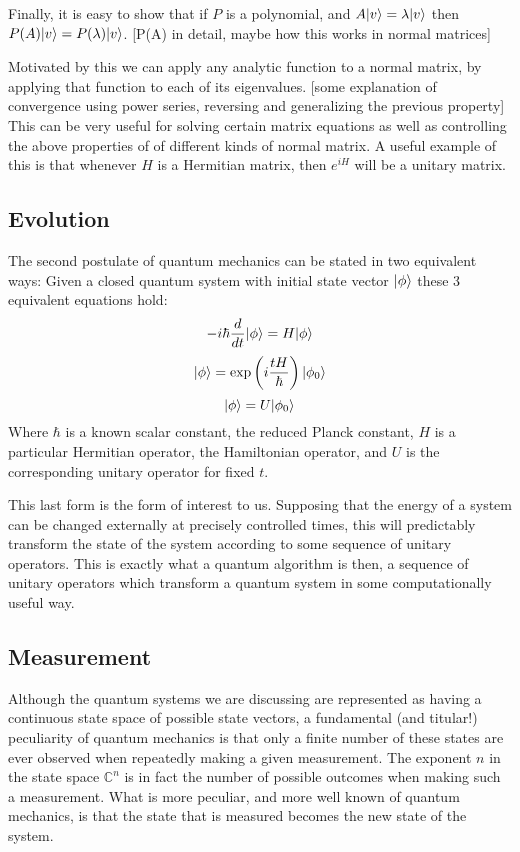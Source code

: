 Finally, it is easy to show that if $P$ is a polynomial, and $A| v \rangle = \lambda| v \rangle$ then $P(A)| v \rangle = P(\lambda)| v \rangle$. [P(A) in detail, maybe how this works in normal matrices]

Motivated by this we can apply any analytic function to a normal matrix, by applying that function to each of its eigenvalues. [some explanation of convergence using power series, reversing  and generalizing the previous property] This can be very useful for solving certain matrix equations as well as controlling the above properties of of different kinds of normal matrix. A useful example of this is that whenever $H$ is a Hermitian matrix, then $e^{iH}$ will be a unitary matrix.
\subsection{Evolution}
The second postulate of quantum mechanics can be stated in two equivalent ways: Given a closed quantum system with initial state vector $| \phi \rangle$ these 3 equivalent equations hold:
\[-i\hbar\frac{d}{dt}| \phi \rangle = H| \phi \rangle\]
\[| \phi \rangle = \exp\left(i \frac{tH}{\hbar}\right)| \phi_0 \rangle\]
\[| \phi \rangle = U| \phi_0 \rangle\]
Where $\hbar$ is a known scalar constant, the reduced Planck constant, $H$ is a particular Hermitian operator, the Hamiltonian operator, and $U$ is the corresponding unitary operator for fixed $t$.

This last form is the form of interest to us. Supposing that the energy of a system can be changed externally at precisely controlled times, this will predictably transform the state of the system according to some sequence of unitary operators. This is exactly what a quantum algorithm is then, a sequence of unitary operators which transform a quantum system in some computationally useful way.
\subsection{Measurement}
Although the quantum systems we are discussing are represented as having a continuous state space of possible state vectors, a fundamental (and titular!) peculiarity of quantum mechanics is that only a finite number of these states are ever observed when repeatedly making a given measurement. The exponent $n$ in the state space $\mathbb{C}^n$ is in fact the number of possible outcomes when making such a measurement. What is more peculiar, and more well known of quantum mechanics, is that the state that is measured becomes the new state of the system.

